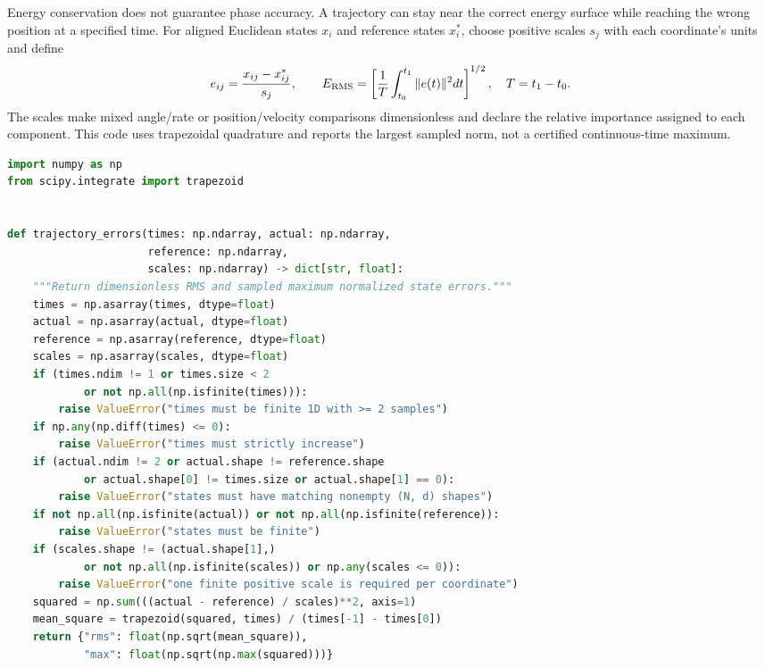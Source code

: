 Energy conservation does not guarantee phase accuracy. A trajectory can stay
near the correct energy surface while reaching the wrong position at a specified
time. For aligned Euclidean states $x_i$ and reference states $x_i^*$, choose
positive scales $s_j$ with each coordinate's units and define
\begin{equation}
 e_{ij}=\frac{x_{ij}-x_{ij}^*}{s_j},\qquad
 E_{\rm RMS}=\left[\frac{1}{T}\int_{t_0}^{t_1}\|e(t)\|^2dt\right]^{1/2},
 \quad T=t_1-t_0.
\end{equation}
The scales make mixed angle/rate or position/velocity comparisons dimensionless
and declare the relative importance assigned to each component. This code uses
trapezoidal quadrature and reports the largest sampled norm, not a certified
continuous-time maximum.

\begin{lstlisting}[language=Python, caption={Time-Weighted Errors on an Aligned Euclidean Grid}]
import numpy as np
from scipy.integrate import trapezoid


def trajectory_errors(times: np.ndarray, actual: np.ndarray,
                      reference: np.ndarray,
                      scales: np.ndarray) -> dict[str, float]:
    """Return dimensionless RMS and sampled maximum normalized state errors."""
    times = np.asarray(times, dtype=float)
    actual = np.asarray(actual, dtype=float)
    reference = np.asarray(reference, dtype=float)
    scales = np.asarray(scales, dtype=float)
    if (times.ndim != 1 or times.size < 2
            or not np.all(np.isfinite(times))):
        raise ValueError("times must be finite 1D with >= 2 samples")
    if np.any(np.diff(times) <= 0):
        raise ValueError("times must strictly increase")
    if (actual.ndim != 2 or actual.shape != reference.shape
            or actual.shape[0] != times.size or actual.shape[1] == 0):
        raise ValueError("states must have matching nonempty (N, d) shapes")
    if not np.all(np.isfinite(actual)) or not np.all(np.isfinite(reference)):
        raise ValueError("states must be finite")
    if (scales.shape != (actual.shape[1],)
            or not np.all(np.isfinite(scales)) or np.any(scales <= 0)):
        raise ValueError("one finite positive scale is required per coordinate")
    squared = np.sum(((actual - reference) / scales)**2, axis=1)
    mean_square = trapezoid(squared, times) / (times[-1] - times[0])
    return {"rms": float(np.sqrt(mean_square)),
            "max": float(np.sqrt(np.max(squared)))}
\end{lstlisting}

